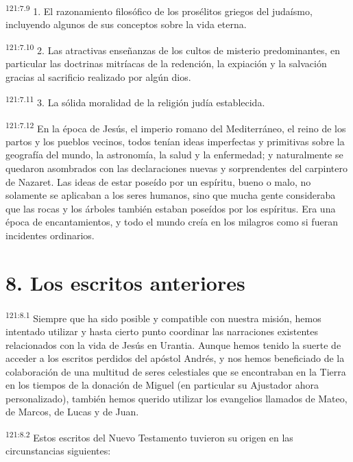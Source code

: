 \par
\textsuperscript{121:7.9} 1. El razonamiento filosófico de los prosélitos griegos del judaísmo, incluyendo algunos de sus conceptos sobre la vida eterna.

\par
\textsuperscript{121:7.10} 2. Las atractivas enseñanzas de los cultos de misterio predominantes, en particular las doctrinas mitríacas de la redención, la expiación y la salvación gracias al sacrificio realizado por algún dios.

\par
\textsuperscript{121:7.11} 3. La sólida moralidad de la religión judía establecida.

\par
\textsuperscript{121:7.12} En la época de Jesús, el imperio romano del Mediterráneo, el reino de los partos y los pueblos vecinos, todos tenían ideas imperfectas y primitivas sobre la geografía del mundo, la astronomía, la salud y la enfermedad; y naturalmente se quedaron asombrados con las declaraciones nuevas y sorprendentes del carpintero de Nazaret. Las ideas de estar poseído por un espíritu, bueno o malo, no solamente se aplicaban a los seres humanos, sino que mucha gente consideraba que las rocas y los árboles también estaban poseídos por los espíritus. Era una época de encantamientos, y todo el mundo creía en los milagros como si fueran incidentes ordinarios.

\section*{8. Los escritos anteriores}
\par
\textsuperscript{121:8.1} Siempre que ha sido posible y compatible con nuestra misión, hemos intentado utilizar y hasta cierto punto coordinar las narraciones existentes relacionados con la vida de Jesús en Urantia. Aunque hemos tenido la suerte de acceder a los escritos perdidos del apóstol Andrés, y nos hemos beneficiado de la colaboración de una multitud de seres celestiales que se encontraban en la Tierra en los tiempos de la donación de Miguel (en particular su Ajustador ahora personalizado), también hemos querido utilizar los evangelios llamados de Mateo, de Marcos, de Lucas y de Juan.

\par
\textsuperscript{121:8.2} Estos escritos del Nuevo Testamento tuvieron su origen en las circunstancias siguientes:

